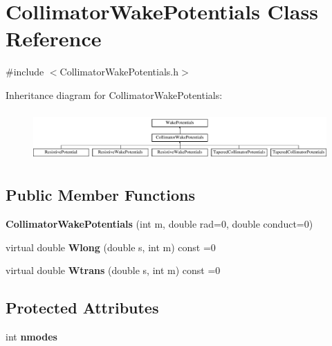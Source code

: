 \hypertarget{classCollimatorWakePotentials}{}\section{Collimator\+Wake\+Potentials Class Reference}
\label{classCollimatorWakePotentials}


{\ttfamily \#include $<$Collimator\+Wake\+Potentials.\+h$>$}

Inheritance diagram for Collimator\+Wake\+Potentials\+:\begin{figure}[H]
\begin{center}
\leavevmode
\includegraphics[height=1.898305cm]{classCollimatorWakePotentials}
\end{center}
\end{figure}
\subsection*{Public Member Functions}
\begin{DoxyCompactItemize}
\item 
\mbox{\label{classCollimatorWakePotentials_ab22c8d82e26094888578038b9038edc4}} 
{\bfseries Collimator\+Wake\+Potentials} (int m, double rad=0, double conduct=0)
\item 
\mbox{\label{classCollimatorWakePotentials_a9bb8993b24d511ef41d43c7273b232da}} 
virtual double {\bfseries Wlong} (double s, int m) const =0
\item 
\mbox{\label{classCollimatorWakePotentials_a2c1dd7c28101b8fbe26b6dcf889ddeaa}} 
virtual double {\bfseries Wtrans} (double s, int m) const =0
\end{DoxyCompactItemize}
\subsection*{Protected Attributes}
\begin{DoxyCompactItemize}
\item 
\mbox{\label{classCollimatorWakePotentials_a1286185550a00371317d394f65c23d48}} 
int {\bfseries nmodes}
\end{DoxyCompactItemize}


